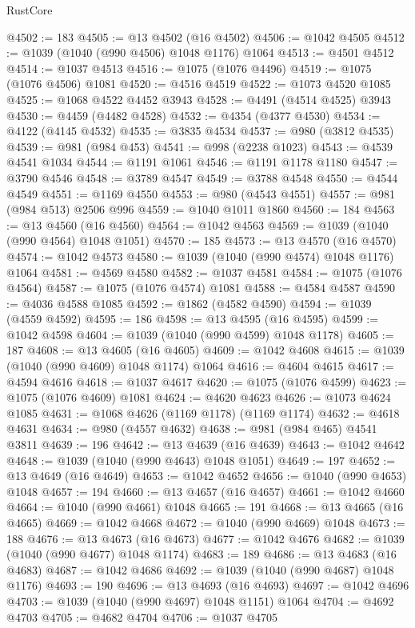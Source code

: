 \begin{lexlean}{RustCore}
\begin{coremodule}
@4502 := 183
@4505 := @13 @4502 (@16 @4502)
@4506 := @1042 @4505
@4512 := @1039 (@1040 (@990 @4506) @1048 @1176) @1064
@4513 := @4501 @4512
@4514 := @1037 @4513
@4516 := @1075 (@1076 @4496)
@4519 := @1075 (@1076 @4506) @1081
@4520 := @4516 @4519
@4522 := @1073 @4520 @1085
@4525 := @1068 @4522 @4452 @3943
@4528 := @4491 (@4514 @4525) @3943
@4530 := @4459 (@4482 @4528)
@4532 := @4354 (@4377 @4530)
@4534 := @4122 (@4145 @4532)
@4535 := @3835 @4534
@4537 := @980 (@3812 @4535)
@4539 := @981 (@984 @453)
@4541 := @998 (@2238 @1023)
@4543 := @4539 @4541 @1034
@4544 := @1191 @1061
@4546 := @1191 @1178 @1180
@4547 := @3790 @4546
@4548 := @3789 @4547
@4549 := @3788 @4548
@4550 := @4544 @4549
@4551 := @1169 @4550
@4553 := @980 (@4543 @4551)
@4557 := @981 (@984 @513) @2506 @996
@4559 := @1040 @1011 @1860
@4560 := 184
@4563 := @13 @4560 (@16 @4560)
@4564 := @1042 @4563
@4569 := @1039 (@1040 (@990 @4564) @1048 @1051)
@4570 := 185
@4573 := @13 @4570 (@16 @4570)
@4574 := @1042 @4573
@4580 := @1039 (@1040 (@990 @4574) @1048 @1176) @1064
@4581 := @4569 @4580
@4582 := @1037 @4581
@4584 := @1075 (@1076 @4564)
@4587 := @1075 (@1076 @4574) @1081
@4588 := @4584 @4587
@4590 := @4036 @4588 @1085
@4592 := @1862 (@4582 @4590)
@4594 := @1039 (@4559 @4592)
@4595 := 186
@4598 := @13 @4595 (@16 @4595)
@4599 := @1042 @4598
@4604 := @1039 (@1040 (@990 @4599) @1048 @1178)
@4605 := 187
@4608 := @13 @4605 (@16 @4605)
@4609 := @1042 @4608
@4615 := @1039 (@1040 (@990 @4609) @1048 @1174) @1064
@4616 := @4604 @4615
@4617 := @4594 @4616
@4618 := @1037 @4617
@4620 := @1075 (@1076 @4599)
@4623 := @1075 (@1076 @4609) @1081
@4624 := @4620 @4623
@4626 := @1073 @4624 @1085
@4631 := @1068 @4626 (@1169 @1178) (@1169 @1174)
@4632 := @4618 @4631
@4634 := @980 (@4557 @4632)
@4638 := @981 (@984 @465) @4541 @3811
@4639 := 196
@4642 := @13 @4639 (@16 @4639)
@4643 := @1042 @4642
@4648 := @1039 (@1040 (@990 @4643) @1048 @1051)
@4649 := 197
@4652 := @13 @4649 (@16 @4649)
@4653 := @1042 @4652
@4656 := @1040 (@990 @4653) @1048
@4657 := 194
@4660 := @13 @4657 (@16 @4657)
@4661 := @1042 @4660
@4664 := @1040 (@990 @4661) @1048
@4665 := 191
@4668 := @13 @4665 (@16 @4665)
@4669 := @1042 @4668
@4672 := @1040 (@990 @4669) @1048
@4673 := 188
@4676 := @13 @4673 (@16 @4673)
@4677 := @1042 @4676
@4682 := @1039 (@1040 (@990 @4677) @1048 @1174)
@4683 := 189
@4686 := @13 @4683 (@16 @4683)
@4687 := @1042 @4686
@4692 := @1039 (@1040 (@990 @4687) @1048 @1176)
@4693 := 190
@4696 := @13 @4693 (@16 @4693)
@4697 := @1042 @4696
@4703 := @1039 (@1040 (@990 @4697) @1048 @1151) @1064
@4704 := @4692 @4703
@4705 := @4682 @4704
@4706 := @1037 @4705

\end{coremodule}
\end{lexlean}
